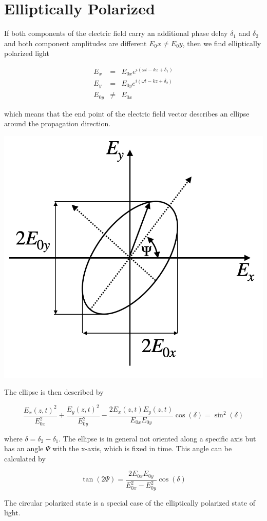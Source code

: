 \documentclass[
  a4paper,
]{book}
\begin{document}
\section{Elliptically Polarized}\label{elliptically-polarized}

If both components of the electric field carry an additional phase delay
\(\delta_1\) and \(\delta_2\) and both component amplitudes are
different \(E_0x\neq E_0y\), then we find elliptically polarized light

\begin{eqnarray}
E_{x}&=&E_{0x}e^{i(\omega t-kz+\delta_1)}\\
E_{y}&=&E_{0y}e^{i(\omega t-kz+\delta_2)}\\
E_{0y}&\neq&E_{0x}
\end{eqnarray}

which means that the end point of the electric field vector describes an
ellipse around the propagation direction.

\includegraphics[width=0.6\linewidth,height=\textheight,keepaspectratio]{electromagnetic-waves/img/elliptical.png}

The ellipse is then described by

\[
\frac{E_x(z,t)^2}{E_{0x}^2}+\frac{E_y(z,t)^2}{E_{0y}^2}-\frac{2E_{x}(z,t)E_y(z,t)}{E_{0x}E_{0y}}\cos(\delta)=\sin^2(\delta)
\]

where \(\delta=\delta_2-\delta_1\). The ellipse is in general not
oriented along a specific axis but has an angle \(\Psi\) with the
x-axis, which is fixed in time. This angle can be calculated by

\[
\tan(2\Psi)=\frac{2E_{0x}E_{0y}}{E^2_{0x}-E_{0y}^2}\cos(\delta)
\]

The circular polarized state is a special case of the elliptically
polarized state of light.
\end{document}
